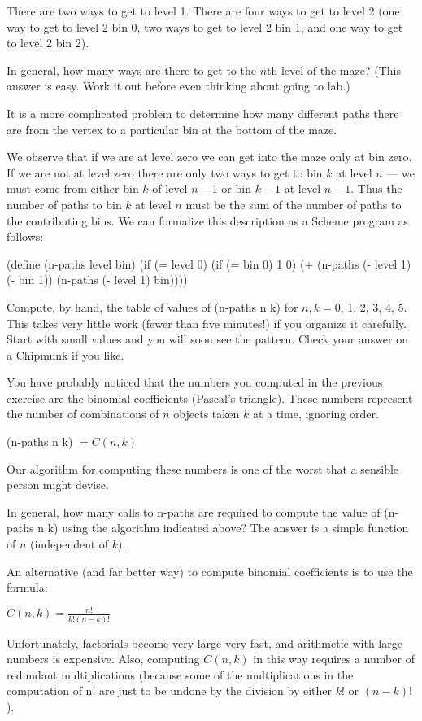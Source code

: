 There are two ways to get to level 1.  There are four ways to get to level 2
(one way to get to level 2 bin 0, two ways to get to level 2 bin 1, and one way
to get to level 2 bin 2).


In general, how many ways are there to get to the $n$th
level of the maze?  (This answer is easy.  Work it out before even
thinking about going to lab.)

It is a more complicated problem to determine how many different paths
there are from the vertex to a particular bin at the bottom of the
maze.

We observe that if we are at level zero we can get into the maze only
at bin zero.  If we are not at level zero there are only two ways to get
to bin $k$ at level $n$ --- we must come from either bin $k$ of level $n-1$ or
bin $k-1$ at level $n-1$.  Thus the number of paths to bin $k$ at level $n$
must be the sum of the number of paths to the contributing bins.  We
can formalize this description as a Scheme program as follows:

\beginlisp
(define (n-paths level bin)
  (if (= level 0)
      (if (= bin 0) 1 0)
      (+ (n-paths (- level 1) (- bin 1))
	 (n-paths (- level 1) bin))))
\endlisp

Compute, by hand, the table of values of {\cf (n-paths n k)} for $n, k = 0$, 1,
2, 3, 4, 5.  This takes very little work (fewer than five minutes!) if you
organize it carefully.  Start with small values and you will soon see the
pattern.  Check your answer on a Chipmunk if you like.

You have probably noticed that the numbers you computed in the previous
exercise are the binomial coefficients (Pascal's triangle).  These numbers
represent the number of combinations of $n$ objects taken $k$ at a time,
ignoring order.

\begin{center}
{\cf (n-paths n k)} $= C(n, k)$
\end{center}

Our algorithm for computing these numbers is one of the worst that a
sensible person might devise.


In general, how many calls to {\cf n-paths} are required to
compute the value of {\cf (n-paths n k)} using the algorithm indicated
above?  The answer is a simple function of $n$ (independent of $k$).

An alternative (and far better way) to compute binomial coefficients
is to use the formula:
\begin{center}
$C(n, k) = \frac{n!}{k! (n-k)!}$
\end{center}
Unfortunately, factorials become very large very fast, and arithmetic
with large numbers is expensive.  Also, computing $C(n, k)$ in this way
requires a number of redundant multiplications (because some of the
multiplications in the computation of n! are just to be undone by the
division by either $k!$ or $(n-k)!$).

